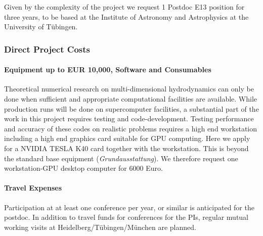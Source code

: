 \documentclass[10pt,fleqn,twoside]{article}
\begin{document}
Given by the complexity of the project we request 1 Postdoc E13 position for three years,
to be based at the Institute of Astronomy and Astrophysics at the University of T\"ubingen.

\subsubsection{Direct Project Costs}

\paragraph{Equipment up to EUR 10,000, Software and Consumables}
Theoretical numerical research on multi-dimensional hydrodynamics can only be done when sufficient and
appropriate computational facilities are available. While production runs
will be done on supercomputer facilities, a substantial part of the work in
this project requires testing and code-development.
Testing performance and accuracy of these codes on realistic problems
requires a high end workstation including a high end graphics card suitable for
GPU computing. Here we apply for a NVIDIA TESLA K40 card together with the workstation.
This is beyond the standard base equipment (\textit{Grundausstattung}).
We therefore request one workstation-GPU desktop computer for 6000 Euro.

\paragraph{Travel Expenses}
Participation at at least one conference per year, or similar is anticipated
for the postdoc. In addition to travel funds for conferences for the PIs,
regular mutual working visits at Heidelberg/T\"ubingen/M\"unchen are
planned.

\end{document}
